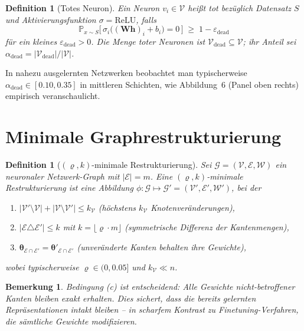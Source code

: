 ﻿\documentclass[12pt, a4paper, openany]{report}
\newtheorem{definition}[theorem]{Definition}
\newtheorem{remark}[theorem]{Bemerkung}
\newcommand{\Prob}{\mathbb{P}}
\newcommand{\calG}{\mathcal{G}}
\newcommand{\calV}{\mathcal{V}}
\newcommand{\calE}{\mathcal{E}}
\newcommand{\calW}{\mathcal{W}}
\newcommand{\eps}{\varepsilon}
\begin{document}
\begin{definition}[Totes Neuron]
\label{def:dead}
Ein Neuron $v_i \in \calV$ heißt \emph{tot} bezüglich Datensatz $S$ und
Aktivierungsfunktion $\sigma = \mathrm{ReLU}$, falls
\[
  \Prob_{x \sim S}\!\bigl[\,\sigma_i\bigl((\bm{W}\bm{h})_i + b_i\bigr) = 0\,\bigr]
  \;\geq\; 1 - \eps_{\mathrm{dead}}
\]
für ein kleines $\eps_{\mathrm{dead}} > 0$.  Die Menge toter Neuronen ist
$\calV_{\mathrm{dead}} \subseteq \calV$; ihr Anteil sei
$\alpha_{\mathrm{dead}} = |\calV_{\mathrm{dead}}|/|\calV|$.
\end{definition}

In nahezu ausgelernten Netzwerken beobachtet man typischerweise
$\alpha_{\mathrm{dead}} \in [0.10, 0.35]$ in mittleren Schichten, wie
Abbildung~6 (Panel oben rechts) empirisch veranschaulicht.

\section{Minimale Graphrestrukturierung}

\begin{definition}[$(\varrho, k)$-minimale Restrukturierung]
\label{def:restr}
Sei $\calG = (\calV, \calE, \calW)$ ein neuronaler Netzwerk-Graph mit
$|\calE| = m$.  Eine \emph{$(\varrho, k)$-minimale Restrukturierung} ist
eine Abbildung $\phi : \calG \mapsto \calG' = (\calV', \calE', \calW')$, bei der
\begin{enumerate}[label=(\alph*)]
  \item $|\calV' \setminus \calV| + |\calV \setminus \calV'| \leq k_{\calV}$
        \quad (höchstens $k_{\calV}$ Knotenveränderungen),
  \item $|\calE \triangle \calE'| \leq k$ mit $k = \lfloor \varrho \cdot m \rfloor$
        \quad (symmetrische Differenz der Kantenmengen),
  \item $\bm{\theta}_{\calE \cap \calE'} = \bm{\theta}'_{\calE \cap \calE'}$
        \quad (unveränderte Kanten behalten ihre Gewichte),
\end{enumerate}
wobei typischerweise $\varrho \in (0, 0.05]$ und $k_{\calV} \ll n$.
\end{definition}

\begin{remark}
Bedingung (c) ist entscheidend: Alle Gewichte nicht-betroffener Kanten bleiben
exakt erhalten.  Dies sichert, dass die bereits gelernten Repräsentationen
intakt bleiben -- in scharfem Kontrast zu Finetuning-Verfahren, die sämtliche
Gewichte modifizieren.
\end{remark}
\end{document}
